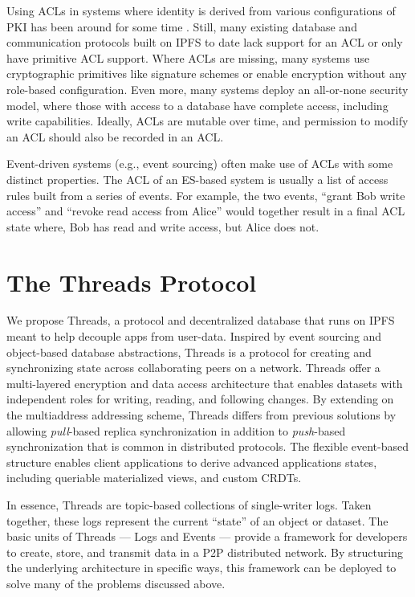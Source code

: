 \documentclass{textile}
\begin{document}
Using ACLs in systems where identity is derived from various configurations of PKI has been around for some time \cite{herzbergAccessControlMeets2000}. Still, many existing database and communication protocols built on IPFS to date lack support for an ACL or only have primitive ACL support. Where ACLs are missing, many systems use cryptographic primitives like signature schemes or enable encryption without any role-based configuration. Even more, many systems deploy an all-or-none security model, where those with access to a database have complete access, including write capabilities. Ideally, ACLs are mutable over time, and permission to modify an ACL should also be recorded in an ACL.

Event-driven systems (e.g., event sourcing) often make use of ACLs with some distinct properties. The ACL of an ES-based system is usually a list of access rules built from a series of events. For example, the two events, ``grant Bob write access'' and ``revoke read access from Alice'' would together result in a final ACL state where, Bob has read and write access, but Alice does not.

\section{The Threads Protocol}\label{sec:ThreadsProtocol}

We propose Threads, a protocol and decentralized database that runs on IPFS meant to help decouple apps from user-data. Inspired by event sourcing and object-based database abstractions, Threads is a protocol for creating and synchronizing state across collaborating peers on a network. Threads offer a multi-layered encryption and data access architecture that enables datasets with independent roles for writing, reading, and following changes. By extending on the multiaddress addressing scheme, Threads differs from previous solutions by allowing \emph{pull}-based replica synchronization in addition to \emph{push}-based synchronization that is common in distributed protocols. The flexible event-based structure enables client applications to derive advanced applications states, including queriable materialized views, and custom CRDTs.

In essence, Threads are topic-based collections of single-writer logs. Taken together, these logs represent the current ``state'' of an object or dataset. The basic units of Threads --- Logs and Events --- provide a framework for developers to create, store, and transmit data in a P2P distributed network. By structuring the underlying architecture in specific ways, this framework can be deployed to solve many of the problems discussed above.
\end{document}
